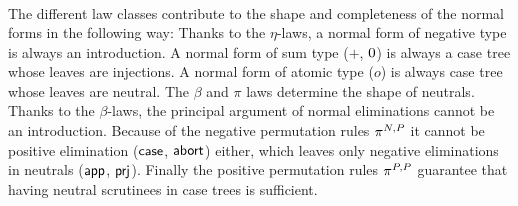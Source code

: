 \documentclass[a4paper,USenglish,cleveref, autoref]{lipics-v2019}
\begin{document}
\begin{gather*}
\end{gather*}
The different law classes contribute to the shape and completeness of
the normal forms in the following way:
Thanks to the $\eta$-laws, a normal form of negative type is always an
introduction.  A normal form of sum type ($+$, $0$) is always a
case tree whose leaves are injections.  A normal form of atomic type
($o$) is always case tree whose leaves are neutral.
The $\beta$ and $\pi$ laws determine the shape of neutrals.
Thanks to the $\beta$-laws,
the principal argument of normal eliminations cannot be an
introduction.  Because of the negative permutation rules
$\pi^{N,P}$ it cannot be positive elimination
($\mathsf{case}$, $\mathsf{abort}$) either, which leaves only negative eliminations
in neutrals ($\mathsf{app}$, $\mathsf{prj}$).  Finally the positive permutation
rules $\pi^{P,P}$ guarantee that having neutral scrutinees in case
trees is sufficient.
\end{document}
